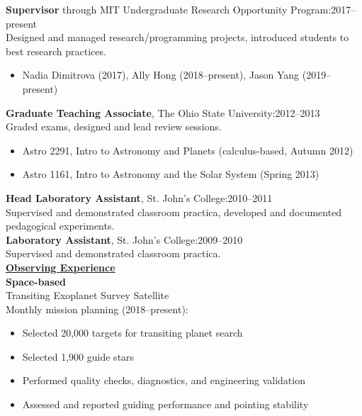 \documentclass[letterpaper,11pt]{article}
\begin{document}
\textbf{Supervisor} through MIT Undergraduate Research Opportunity Program:\hfill2017--present\\
\indent Designed and managed research/programming projects, introduced students to \\
\indent best research practices.
\begin{itemize}[nosep,label=\textbullet]
\item Nadia Dimitrova (2017), Ally Hong (2018--present), Jason Yang (2019--present)
\end{itemize}\textbf{Graduate Teaching Associate}, The Ohio State University:\hfill2012--2013\\
\indent Graded exams, designed and lead review sessions.
\begin{itemize}[nosep, label=\textbullet]
\item Astro 2291,  Intro to Astronomy and Planets (calculus-based, Autumn 2012)
\item Astro 1161,  Intro to Astronomy and the Solar System (Spring 2013)
\end{itemize}
\textbf{Head Laboratory Assistant}, St. John's College:\hfill2010--2011\\
\indent Supervised and demonstrated classroom practica, developed and documented\\
 \indent  pedagogical experiments.\\
\textbf{Laboratory Assistant}, St. John's College:\hfill2009--2010\\
\indent Supervised and demonstrated classroom practica.\\
\clearpage
\noindent \underline{\textbf{Observing Experience}}\\
\textbf{Space-based}\\
Transiting Exoplanet Survey Satellite\\
\indent Monthly mission planning (2018--present):
\begin{itemize}[nosep,label=\textbullet]
\item Selected 20,000 targets for transiting planet search
\item Selected 1,900 guide stars
\item Performed quality checks, diagnostics, and engineering validation
\item Assessed and reported guiding performance and pointing stability
\end{itemize}
\end{document}
